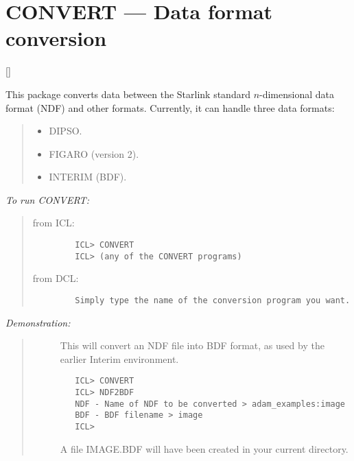 \newpage

\section{CONVERT --- Data format conversion} 

\vspace{-11mm}

\hfill []

\vspace{5mm}

This package converts data between the Starlink standard $n$-dimensional data
format (NDF) and other formats.
Currently, it can handle three data formats:

{\small
\begin{quote}
\begin{itemize}
\item DIPSO.
\item FIGARO (version 2).
\item INTERIM (BDF).
\end{itemize}
\end{quote}
}

{\em To run CONVERT:}\hfill
\begin{quote}
\begin{description}

\item [from ICL:]\hfill

\begin{small}
\begin{verbatim}
   ICL> CONVERT
   ICL> (any of the CONVERT programs)
\end{verbatim}
\end{small}

\item [from DCL:]\hfill

\begin{small}
\begin{verbatim}
   Simply type the name of the conversion program you want.
\end{verbatim}
\end{small}

\end{description}
\end{quote}

{\em Demonstration:}\hfill
\begin{quote}
\begin{description}
\item [] This will convert an NDF file into BDF format, as used by the
earlier Interim environment.

\begin{small}
\begin{verbatim}
   ICL> CONVERT
   ICL> NDF2BDF
   NDF - Name of NDF to be converted > adam_examples:image
   BDF - BDF filename > image
   ICL>
\end{verbatim}
\end{small}

A file IMAGE.BDF will have been created in your current directory.
\end{description}
\end{quote}

